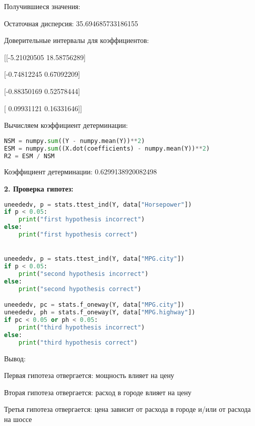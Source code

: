 \documentclass{article}
\begin{document}
Получившиеся значения:

Остаточная дисперсия: 35.694685733186155

Доверительные интервалы для коэффициентов:

[[-5.21020505 18.58756289]

 [-0.74812245  0.67092209]
 
 [-0.88350169  0.52578444]
 
 [ 0.09931121  0.16331646]]

Вычисляем коэффициент детерминации:
\begin{lstlisting}[language=Python, mathescape=true, breaklines=true]
NSM = numpy.sum((Y - numpy.mean(Y))**2)
ESM = numpy.sum((X.dot(coefficients) - numpy.mean(Y))**2)
R2 = ESM / NSM
\end{lstlisting} 
Коэффициент детерминации: 0.6299138920082498

\textbf{2. Проверка гипотез:}
\begin{lstlisting}[language=Python, mathescape=true, breaklines=true]
uneededv, p = stats.ttest_ind(Y, data["Horsepower"])
if p < 0.05:
    print("first hypothesis incorrect")
else:
    print("first hypothesis correct")


uneededv, p = stats.ttest_ind(Y, data["MPG.city"])
if p < 0.05:
    print("second hypothesis incorrect")
else:
    print("second hypothesis correct")

uneededv, pc = stats.f_oneway(Y, data["MPG.city"])
uneededv, ph = stats.f_oneway(Y, data["MPG.highway"])
if pc < 0.05 or ph < 0.05:
    print("third hypothesis incorrect")
else:
    print("third hypothesis correct")
\end{lstlisting}
Вывод:

Первая гипотеза отвергается: мощность влияет на цену

Вторая гипотеза отвергается: расход в городе влияет на цену

Третья гипотеза отвергается: цена зависит от расхода в городе и/или от расхода на шоссе
\end{document}
